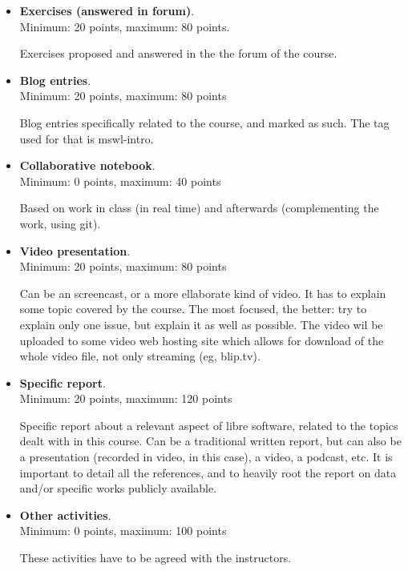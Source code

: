 \documentclass[a4paper]{article}
\begin{document}
\begin{itemize}
\item \textbf{Exercises (answered in forum)}. \\
  Minimum: 20 points, maximum: 80 points.

  Exercises proposed and answered in the the forum of the course.

\item \textbf{Blog entries}. \\
  Minimum: 20 points, maximum: 80 points

  Blog entries specifically related to the course, and marked as such. The tag used for that is mswl-intro.

\item \textbf{Collaborative notebook}. \\
  Minimum: 0 points, maximum: 40 points

  Based on work in class (in real time) and afterwards (complementing the work, using git).

\item \textbf{Video presentation}. \\
  Minimum: 20 points, maximum: 80 points

  Can be an screencast, or a more ellaborate kind of video. It has to explain some topic covered by the course. The most focused, the better: try to explain only one issue, but explain it as well as possible. The video wil be uploaded to some video web hosting site which allows for download of the whole video file, not only streaming (eg, blip.tv).

\item \textbf{Specific report}. \\
  Minimum: 20 points, maximum: 120 points

  Specific report about a relevant aspect of libre software, related to the topics dealt with in this course. Can be a traditional written report, but can also be a presentation (recorded in video, in this case), a video, a podcast, etc. It is important to detail all the references, and to heavily root the report on data and/or specific works publicly available.

\item \textbf{Other activities}. \\
  Minimum: 0 points, maximum: 100 points

  These activities have to be agreed with the instructors.
\end{itemize}
\end{document}
